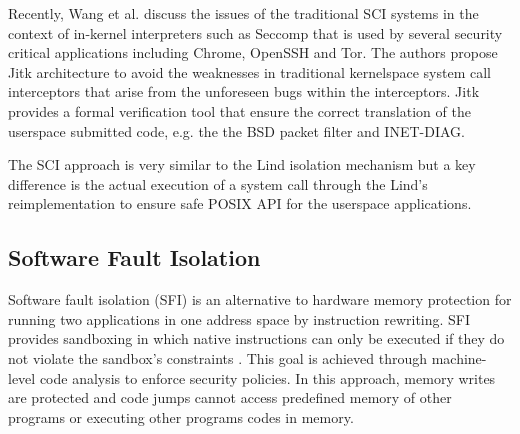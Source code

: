 Recently, Wang et al. \cite{Jitk} discuss the issues of the traditional SCI systems in the context of in-kernel interpreters such as Seccomp that is used by several security critical applications including Chrome, OpenSSH and Tor. The authors propose Jitk architecture to avoid the weaknesses in traditional kernelspace system call interceptors that arise from the unforeseen bugs within the interceptors. Jitk provides a formal verification tool that ensure the correct translation of the userspace submitted code, e.g. the  the BSD packet filter and INET-DIAG.        




The SCI approach is very similar to the Lind isolation mechanism but a key difference is the actual execution of a system call through the Lind's reimplementation to ensure safe POSIX API for the userspace applications.

\subsection{Software Fault Isolation}
Software fault isolation (SFI) is an alternative to hardware memory
protection for running two applications in one address space by
instruction rewriting. SFI provides sandboxing in which native
instructions can only be executed if they do not violate the sandbox's
constraints \cite{SFI:93}. This goal is achieved through machine-level
code analysis to enforce security policies. In this approach, memory
writes are protected and code jumps cannot access predefined memory of
other programs or executing other programs codes in memory.

